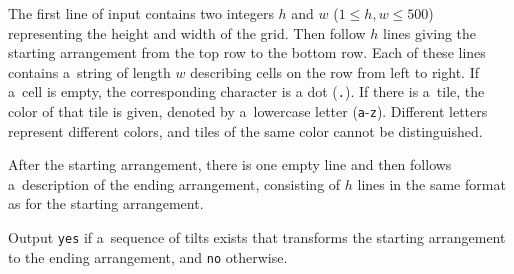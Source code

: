 \begin{Input}
The first line of input contains two integers $h$ and $w$ ($1\le h,w\le 500$) representing the height and width of the grid.
Then follow $h$ lines giving the starting arrangement from the top row to the bottom row.
Each of these lines contains a~string of length $w$ describing cells on the row from left to right.
If a~cell is empty, the corresponding character is a dot (\texttt{.}).
If there is a~tile, the color of that tile is given, denoted by a~lowercase letter (\texttt{a}-\texttt{z}).
Different letters represent different colors, and tiles of the same color cannot be distinguished.

After the starting arrangement, there is one empty line and then follows a~description of the ending arrangement,
consisting of $h$ lines in the same format as for the starting arrangement.
\end{Input}


\begin{Output}
Output \texttt{yes} if a~sequence of tilts exists that transforms the starting arrangement to the ending arrangement, and \texttt{no} otherwise.
\end{Output}

